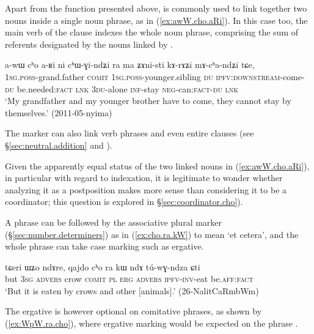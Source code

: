  
 Apart from the function presented above,  is commonly used to link together two nouns inside a single noun phrase, as in (\ref{ex:awW.cho.aRi}). In this case too, the main verb of the clause indexes the whole noun phrase, comprising the sum of referents designated by the nouns linked by .

\begin{exe}
\ex \label{ex:awW.cho.aRi}
\gll a-wɯ cʰo a-ʁi ni cʰɯ-ɣi-ndʑi ra ma ʑɤni-sti kɤ-rɤʑi mɤ-cʰa-ndʑi tɕe, \\
\textsc{1sg}.\textsc{poss}-grand.father \textsc{comit} \textsc{1sg}.\textsc{poss}-younger.sibling \textsc{du} \textsc{ipfv}:\textsc{downstream}-come-\textsc{du} be.needed:\textsc{fact} \textsc{lnk} \textsc{3du}-alone \textsc{inf}-stay \textsc{neg}-can:\textsc{fact}-\textsc{du} \textsc{lnk} \\ 
\glt `My grandfather and my younger brother have to come, they cannot stay by themselves.' (2011-05-nyima)
\end{exe}

The marker  can also link verb phrases and even entire clauses (see §\ref{sec:neutral.addition} and \citealt[313]{jacques14linking}).


Given the apparently equal status of the two linked nouns in (\ref{ex:awW.cho.aRi}), in particular with regard to indexation, it is legitimate to wonder whether analyzing it as a postposition makes more sense than considering it to be a coordinator; this question is explored in §\ref{sec:coordinator.cho}). 

A  phrase can be followed by the associative plural marker  (§\ref{sec:number.determiners}) as in (\ref{ex:cho.ra.kW}) to mean `et cetera', and the whole phrase can take case marking such as ergative.

\begin{exe}
\ex \label{ex:cho.ra.kW}
\gll tɕeri ɯʑo ndɤre, qajdo cʰo ra kɯ ndɤ tú-wɣ-ndza ɕti \\
but \textsc{3sg} \textsc{advers} crow \textsc{comit} \textsc{pl} \textsc{erg} \textsc{advers} \textsc{ipfv}-\textsc{inv}-eat be.\textsc{aff}:\textsc{fact} \\
\glt `But it is eaten by crows and other [animals].' (26-NalitCaRmbWm)
\end{exe}

The ergative  is however optional on comitative phrases, as shown by (\ref{ex:WpW.ra.cho}), where ergative marking would be expected on the phrase .

